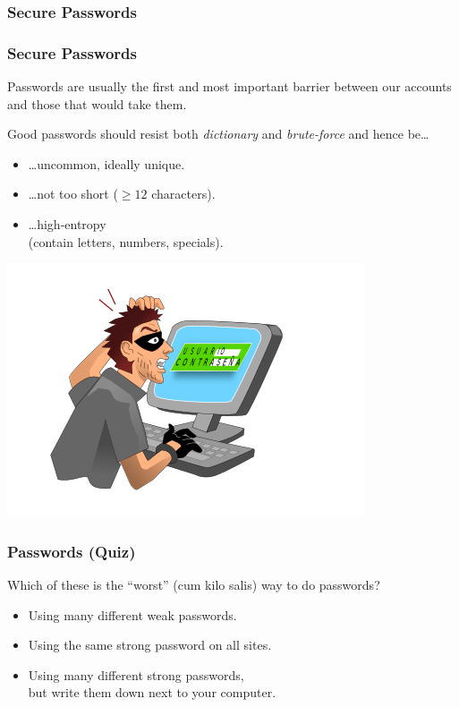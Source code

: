 \documentclass[aspectratio=1610,dvipsnames]{beamer}
\begin{document}
\subsubsection{Secure Passwords}

\begin{frame}
\frametitle{Secure Passwords}
\begin{minipage}{0.5\textwidth}
Passwords are usually the first and most important barrier between our accounts and those that would take them.
\bigskip

Good passwords should resist both \emph{dictionary} and \emph{brute-force}
and hence be\dots 
\medskip

\begin{itemize}
\item\dots uncommon, ideally unique.
\item\dots not too short ($\geq 12$ characters).
\item\dots high-entropy\\ (contain letters, numbers, specials).
\end{itemize}
\end{minipage}%
\begin{minipage}{0.5\textwidth}
\begin{center}
\includegraphics[scale=0.6]{images/hacker.png} 
\end{center}
\end{minipage}
\end{frame}


\begin{frame}
\frametitle{Passwords (Quiz)}

Which of these is the ``worst'' (cum kilo salis) way to do passwords?
\bigskip

\begin{itemize}
\item Using many different weak passwords.
\item Using the same strong password on all sites.
\item Using many different strong passwords,\\ but write them down next to your computer.
\end{itemize}

\end{frame}
\end{document}
